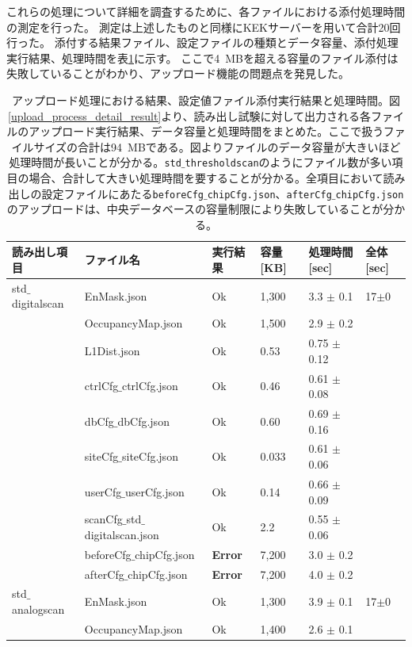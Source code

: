 これらの処理について詳細を調査するために、各ファイルにおける添付処理時間の測定を行った。
測定は上述したものと同様にKEKサーバーを用いて合計20回行った。
添付する結果ファイル、設定ファイルの種類とデータ容量、添付処理実行結果、処理時間を表\ref{upload_status_to_pd}に示す。
ここで4~MBを超える容量のファイル添付は失敗していることがわかり、アップロード機能の問題点を発見した。

\clearpage
{ \scriptsize
\begin{longtable}{|llllll|}
  \caption[アップロード処理における結果、設定値ファイル添付実行結果と処理時間]{アップロード処理における結果、設定値ファイル添付実行結果と処理時間。図\ref{upload_process_detail_result}より、読み出し試験に対して出力される各ファイルのアップロード実行結果、データ容量と処理時間をまとめた。ここで扱うファイルサイズの合計は94~MBである。図よりファイルのデータ容量が大きいほど処理時間が長いことが分かる。\texttt{std$\_$thresholdscan}のようにファイル数が多い項目の場合、合計して大きい処理時間を要することが分かる。全項目において読み出しの設定ファイルにあたる\texttt{beforeCfg$\_$chipCfg.json}、\texttt{afterCfg$\_$chipCfg.json}のアップロードは、中央データベースの容量制限により失敗していることが分かる。}
  \label{upload_status_to_pd}
  \endhead
  \hline
  読み出し項目 & ファイル名 & 実行結果 & 容量[KB] & 処理時間[sec] & 全体[sec]\\ 
  \hline
std$\_$digitalscan & EnMask.json & Ok & 1,300 & 3.3 $\pm$ 0.1 & 17$\pm$0 \\
 & OccupancyMap.json & Ok & 1,500 & 2.9 $\pm$ 0.2 & \\
 & L1Dist.json & Ok & 0.53 & 0.75 $\pm$ 0.12 & \\
 & ctrlCfg$\_$ctrlCfg.json & Ok & 0.46 & 0.61 $\pm$ 0.08 & \\
 & dbCfg$\_$dbCfg.json & Ok & 0.60 & 0.69 $\pm$ 0.16 & \\
 & siteCfg$\_$siteCfg.json & Ok & 0.033 & 0.61 $\pm$ 0.06 & \\
 & userCfg$\_$userCfg.json & Ok & 0.14 & 0.66 $\pm$ 0.09 & \\
 & scanCfg$\_$std$\_$digitalscan.json & Ok & 2.2 & 0.55 $\pm$ 0.06 & \\
 & beforeCfg$\_$chipCfg.json & { \bf Error} & 7,200 & 3.0 $\pm$ 0.2 & \\
 & afterCfg$\_$chipCfg.json & { \bf Error} & 7,200 & 4.0 $\pm$ 0.2 & \\
\hline
std$\_$analogscan & EnMask.json & Ok & 1,300 & 3.9 $\pm$ 0.1 & 17$\pm$0\\
 & OccupancyMap.json & Ok & 1,400 & 2.6 $\pm$ 0.1 & \\

\end{longtable}}
